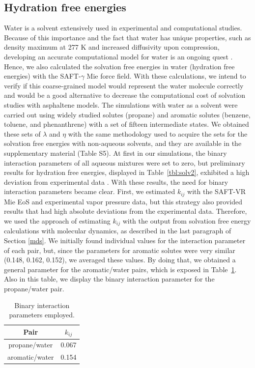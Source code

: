 \documentclass[final,12p,times,twocolumn]{elsarticle}
\begin{document}
	\subsection{Hydration free energies}
	
	Water is a solvent extensively used in experimental and computational studies. Because of this importance and the fact that water has unique properties, such as density maximum at 277 K and increased diffusivity upon compression, developing an accurate computational model for water is an ongoing quest \cite{hadley2012}. Hence, we also calculated the solvation free energies in water (hydration free energies) with the SAFT-$\gamma$ Mie force field. With these calculations, we intend to verify if this coarse-grained model would represent the water molecule correctly and would be a good alternative to decrease the computational cost of solvation studies with asphaltene models. The simulations with water as a solvent were carried out using widely studied solutes (propane) and aromatic solutes (benzene, toluene, and phenanthrene) with a set of fifteen intermediate states.  We obtained these sets of $\lambda$ and $\eta$ with the same methodology used to acquire the sets for the solvation free energies with non-aqueous solvents, and they are available in the supplementary material (Table S5). At first in our simulations, the binary interaction parameters of all aqueous mixtures were set to zero, but preliminary results for hydration free energies, displayed in Table~\ref{tbl:solv2},  exhibited a high deviation from experimental data \cite{P29900000291, doi:10.1021/ct050097l}. With these results, the need for binary interaction parameters became clear. First, we estimated $k_{ij}$ with the SAFT-VR Mie EoS and experimental vapor pressure data, but this strategy also provided results that had high absolute deviations from the experimental data. Therefore, we used the approach of estimating $k_{ij}$ with the output from solvation free energy calculations with molecular dynamics, as described in the last paragraph of Section \ref{mds}.  We initially found individual values for the interaction parameter of each pair, but, since the parameters for aromatic solutes were very similar (0.148, 0.162, 0.152), we averaged these values. By doing that,  we obtained a general parameter for the aromatic/water pairs, which is exposed in Table~\ref{tbl:kij}. Also in this table, we display the binary interaction parameter for the propane/water pair. 
	
	\begin{table}
		\centering
		\caption{Binary interaction parameters employed.}
		\label{tbl:kij}
		\begin{tabular}{cc}
			\hline\hline
			Pair              & $k_{ij}$ \\ \hline
			propane/water  & 0.067    \\
			aromatic/water & 0.154    \\ \hline\hline
		\end{tabular}
	\end{table}
	
\end{document}
